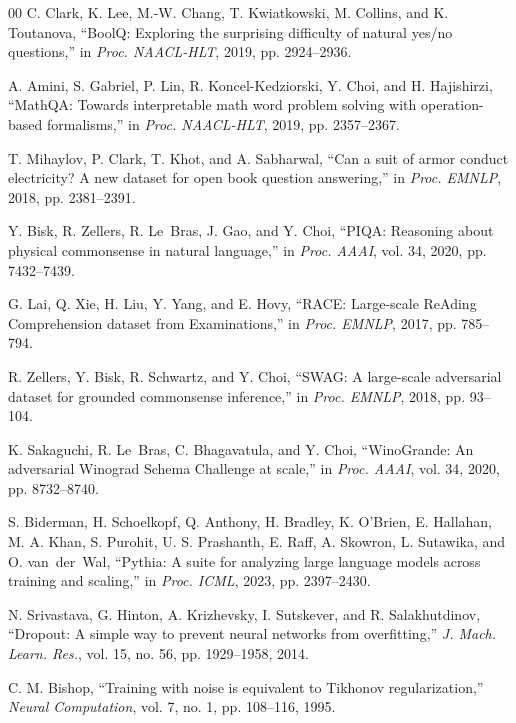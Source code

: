 \documentclass[10pt,conference]{IEEEtran}
\begin{document}
\begin{thebibliography}{00}
 C. Clark, K. Lee, M.-W. Chang, T. Kwiatkowski, M. Collins, and K. Toutanova, ``BoolQ: Exploring the surprising difficulty of natural yes/no questions,'' in \textit{Proc. NAACL-HLT}, 2019, pp. 2924--2936.

 A. Amini, S. Gabriel, P. Lin, R. Koncel-Kedziorski, Y. Choi, and H. Hajishirzi, ``MathQA: Towards interpretable math word problem solving with operation-based formalisms,'' in \textit{Proc. NAACL-HLT}, 2019, pp. 2357--2367.

 T. Mihaylov, P. Clark, T. Khot, and A. Sabharwal, ``Can a suit of armor conduct electricity? A new dataset for open book question answering,'' in \textit{Proc. EMNLP}, 2018, pp. 2381--2391.

 Y. Bisk, R. Zellers, R. Le~Bras, J. Gao, and Y. Choi, ``PIQA: Reasoning about physical commonsense in natural language,'' in \textit{Proc. AAAI}, vol. 34, 2020, pp. 7432--7439.

 G. Lai, Q. Xie, H. Liu, Y. Yang, and E. Hovy, ``RACE: Large-scale ReAding Comprehension dataset from Examinations,'' in \textit{Proc. EMNLP}, 2017, pp. 785--794.

 R. Zellers, Y. Bisk, R. Schwartz, and Y. Choi, ``SWAG: A large-scale adversarial dataset for grounded commonsense inference,'' in \textit{Proc. EMNLP}, 2018, pp. 93--104.

 K. Sakaguchi, R. Le~Bras, C. Bhagavatula, and Y. Choi, ``WinoGrande: An adversarial Winograd Schema Challenge at scale,'' in \textit{Proc. AAAI}, vol. 34, 2020, pp. 8732--8740.

 S. Biderman, H. Schoelkopf, Q. Anthony, H. Bradley, K. O'Brien, E. Hallahan, M. A. Khan, S. Purohit, U. S. Prashanth, E. Raff, A. Skowron, L. Sutawika, and O. van~der~Wal, ``Pythia: A suite for analyzing large language models across training and scaling,'' in \textit{Proc. ICML}, 2023, pp. 2397--2430.

 N. Srivastava, G. Hinton, A. Krizhevsky, I. Sutskever, and R. Salakhutdinov, ``Dropout: A simple way to prevent neural networks from overfitting,'' \textit{J. Mach. Learn. Res.}, vol. 15, no. 56, pp. 1929--1958, 2014.

 C. M. Bishop, ``Training with noise is equivalent to Tikhonov regularization,'' \textit{Neural Computation}, vol. 7, no. 1, pp. 108--116, 1995.


\end{thebibliography}
\end{document}
